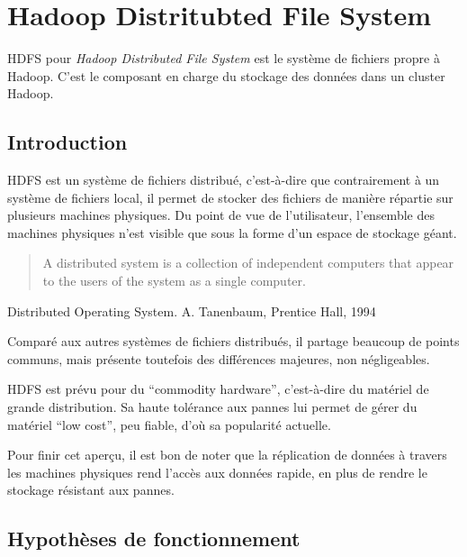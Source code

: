 \section{Hadoop Distritubted File System}

\par HDFS pour \textit{Hadoop Distributed File System} est le système de fichiers propre à Hadoop. C'est le composant en charge du stockage des données dans un cluster Hadoop.

\subsection{Introduction}
\label{sec:introduction}

\par HDFS est un système de fichiers distribué, c'est-à-dire que contrairement à un système de fichiers local, il permet de stocker des fichiers de manière répartie sur plusieurs machines physiques. Du point de vue de l'utilisateur, l'ensemble des machines physiques n'est visible que sous la forme d'un espace de stockage géant. 

\begin{quote}
  A distributed system is a collection of independent computers that appear to the users of the system as a single computer.
\end{quote}

\begin{flushright}
  Distributed Operating System. A. Tanenbaum, Prentice 
  Hall, 1994
\end{flushright}

\par Comparé aux autres systèmes de fichiers distribués, il partage beaucoup de points communs, mais présente toutefois des différences majeures, non négligeables.

\par HDFS est prévu pour du ``commodity hardware'', c'est-à-dire du matériel de grande distribution. Sa haute tolérance aux pannes lui permet de gérer du matériel ``low cost'', peu fiable, d'où sa popularité actuelle.

\par Pour finir cet aperçu, il est bon de noter que la réplication de données à travers les machines physiques rend l'accès aux données rapide, en plus de rendre le stockage résistant aux pannes.   

\subsection{Hypothèses de fonctionnement}
\label{sec:hypoth-de-fonct}

